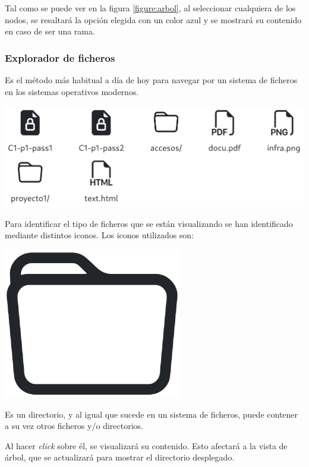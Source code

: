 \documentclass{\ClassPath/viu-tfm-template}
\begin{document}
Tal como se puede ver en la figura \ref{figure:arbol}, al seleccionar cualquiera de los nodos, se resaltará la opción elegida con un color azul y se mostrará su contenido en caso de ser una rama.

\subsubsection*{Explorador de ficheros}

Es el método más habitual a día de hoy para navegar por un sistema de ficheros en los sistemas operativos modernos.

\begin{center}
    \includegraphics[width=0.9\linewidth]{img/browser.png}
\end{center}

Para identificar el tipo de ficheros que se están visualizando se han identificado mediante distintos iconos. Los iconos utilizados son:

{
\begin{minipage}{0.1\linewidth}
    \includegraphics[width=\linewidth]{img/folder.png}
\end{minipage}
\hfill
\begin{minipage}{0.85\linewidth}
    Es un directorio, y al igual que sucede en un sistema de ficheros, puede contener a su vez otros ficheros y/o directorios.

    Al hacer \textit{click} sobre él, se visualizará su contenido. Esto afectará a la vista de árbol, que se actualizará para mostrar el directorio desplegado.
\end{minipage}
}
\end{document}
